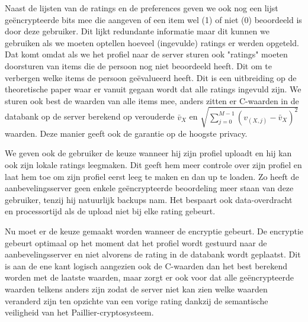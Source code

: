 Naast de lijsten van de ratings en de preferences geven we ook nog een lijst ge\"encrypteerde bits mee die aangeven of een item wel (1) of niet (0) beoordeeld is door deze gebruiker. Dit lijkt redundante informatie maar dit kunnen we gebruiken als we moeten optellen hoeveel (ingevulde) ratings er werden opgeteld.  Dat komt omdat als we het profiel naar de server sturen ook "ratings" moeten doorsturen van items die de persoon nog niet beoordeeld heeft. Dit om te verbergen welke items de persoon ge\"evalueerd heeft. Dit is een uitbreiding op de theoretische paper \cite{ZErkinDyn} waar er vanuit gegaan wordt dat alle ratings ingevuld zijn.  We sturen ook best de waarden van alle items mee, anders zitten er C-waarden in de databank op de server berekend op verouderde $\bar{v}_X$ en $\sqrt{\sum_{j=0}^{M-1} (v_{(X,j)} - \bar{v}_X)^2}$ waarden. Deze manier geeft ook de garantie op de hoogste privacy.

We geven ook de gebruiker de keuze wanneer hij zijn profiel uploadt en hij kan ook zijn lokale ratings leegmaken. Dit geeft hem meer controle over zijn profiel en laat hem toe om zijn profiel eerst leeg te maken en dan up te loaden. Zo heeft de aanbevelingsserver geen enkele ge\"encrypteerde beoordeling meer staan van deze gebruiker, tenzij hij natuurlijk backups nam. Het bespaart ook data-overdracht en processortijd als de upload niet bij elke rating gebeurt.

Nu moet er de keuze gemaakt worden wanneer de encryptie gebeurt. De encryptie gebeurt optimaal op het moment dat het profiel wordt gestuurd naar de aanbevelingsserver en niet alvorens de rating in de databank wordt geplaatst. Dit is aan de ene kant logisch aangezien ook de C-waarden dan het best berekend worden met de laatste waarden, maar zorgt er ook voor dat alle ge\"encrypteerde waarden telkens anders zijn zodat de server niet kan zien welke waarden veranderd zijn ten opzichte van een vorige rating dankzij de semantische veiligheid van het Paillier-cryptosysteem.